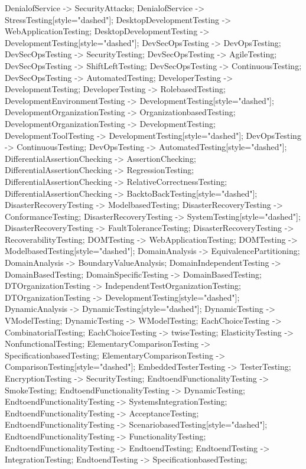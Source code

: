\documentclass{article}
\begin{document}
{DenialofService -> SecurityAttacks;
DenialofService -> StressTesting[style="dashed"];
DesktopDevelopmentTesting -> WebApplicationTesting;
DesktopDevelopmentTesting -> DevelopmentTesting[style="dashed"];
DevSecOpsTesting -> DevOpsTesting;
DevSecOpsTesting -> SecurityTesting;
DevSecOpsTesting -> AgileTesting;
DevSecOpsTesting -> ShiftLeftTesting;
DevSecOpsTesting -> ContinuousTesting;
DevSecOpsTesting -> AutomatedTesting;
DeveloperTesting -> DevelopmentTesting;
DeveloperTesting -> RolebasedTesting;
DevelopmentEnvironmentTesting -> DevelopmentTesting[style="dashed"];
DevelopmentOrganizationTesting -> OrganizationbasedTesting;
DevelopmentOrganizationTesting -> DevelopmentTesting;
DevelopmentToolTesting -> DevelopmentTesting[style="dashed"];
DevOpsTesting -> ContinuousTesting;
DevOpsTesting -> AutomatedTesting[style="dashed"];
DifferentialAssertionChecking -> AssertionChecking;
DifferentialAssertionChecking -> RegressionTesting;
DifferentialAssertionChecking -> RelativeCorrectnessTesting;
DifferentialAssertionChecking -> BacktoBackTesting[style="dashed"];
DisasterRecoveryTesting -> ModelbasedTesting;
DisasterRecoveryTesting -> ConformanceTesting;
DisasterRecoveryTesting -> SystemTesting[style="dashed"];
DisasterRecoveryTesting -> FaultToleranceTesting;
DisasterRecoveryTesting -> RecoverabilityTesting;
DOMTesting -> WebApplicationTesting;
DOMTesting -> ModelbasedTesting[style="dashed"];
DomainAnalysis -> EquivalencePartitioning;
DomainAnalysis -> BoundaryValueAnalysis;
DomainIndependentTesting -> DomainBasedTesting;
DomainSpecificTesting -> DomainBasedTesting;
DTOrganizationTesting -> IndependentTestOrganizationTesting;
DTOrganizationTesting -> DevelopmentTesting[style="dashed"];
DynamicAnalysis -> DynamicTesting[style="dashed"];
DynamicTesting -> VModelTesting;
DynamicTesting -> WModelTesting;
EachChoiceTesting -> CombinatorialTesting;
EachChoiceTesting -> twiseTesting;
ElasticityTesting -> NonfunctionalTesting;
ElementaryComparisonTesting -> SpecificationbasedTesting;
ElementaryComparisonTesting -> ComparisonTesting[style="dashed"];
EmbeddedTesterTesting -> TesterTesting;
EncryptionTesting -> SecurityTesting;
EndtoendFunctionalityTesting -> SmokeTesting;
EndtoendFunctionalityTesting -> DynamicTesting;
EndtoendFunctionalityTesting -> SystemsIntegrationTesting;
EndtoendFunctionalityTesting -> AcceptanceTesting;
EndtoendFunctionalityTesting -> ScenariobasedTesting[style="dashed"];
EndtoendFunctionalityTesting -> FunctionalityTesting;
EndtoendFunctionalityTesting -> EndtoendTesting;
EndtoendTesting -> IntegrationTesting;
EndtoendTesting -> SpecificationbasedTesting;
}
\end{document}
